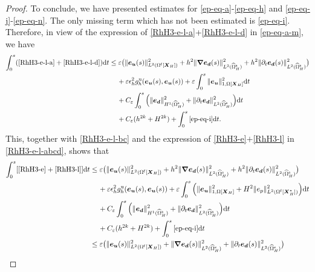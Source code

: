 \documentclass[11pt,reqno]{amsart}
\theoremstyle{definition}
\theoremstyle{plain}
\numberwithin{theorem}{section}
\numberwithin{proposition}{section}
\numberwithin{lemma}{section}
\numberwithin{equation}{section}
\newcommand{\bs}[1]{\boldsymbol{#1}}
\newcommand{\uu}[1]  {{\bs{#1}} }
\newcommand{\dep}{{{\bs{d}}}}
\newcommand{\grad}   { \uu{\nabla}    }
\def\d{\mathrm{d}}
\renewcommand{\(}{\bigl(}
\renewcommand{\)}{\bigr)}
\begin{document}
\begin{proof}
To conclude, we have presented estimates for \eqref{ep-eq-a}-\eqref{ep-eq-h} and \eqref{ep-eq-j}-\eqref{ep-eq-n}. The only missing term which has not been estimated is \eqref{ep-eq-i}. Therefore, in view of the expression of \eqref{RhH3-e-l-a}+\eqref{RhH3-e-l-d} in \eqref{ep-eq-a-m}, we have 
\begin{align}
\int_0^s( \eqref{RhH3-e-l-a}+\eqref{RhH3-e-l-d} )\d t  
&\le \varepsilon \big( \|{\bs e}_{\bs u}(s)\|_{L^2(\Omega^{\rm f}[\bs X_H])}^2 
+ h^2
\|\grad{\bs e}_{\bs d}(s)\|_{L^2(\widehat\Omega^{\rm s}_H)}^2 + h^2 \|\partial_t{\bs e}_{\bs d}(s)\|_{L^2(\widehat\Omega^{\rm s}_H)}^2 \big) \notag\\
&\quad\, + \varepsilon \epsilon_h^2 g^{\rm u}_h({\bs e}_{\bs u}(s),{\bs e}_{\bs u}(s)) + \varepsilon \int_0^s \|{\bs e}_{\bs u}\|_{1,\Omega[{\bs X}_H]}^2 \d t \notag\\
&\quad\, + C_\varepsilon  \int_0^s \Big(\|{\bs e}_\dep\|_{H^1(\widehat{\Omega}^{\rm s}_H)}^2 + \|\partial_t{\bs e}_\dep\|_{L^2(\widehat{\Omega}^{\rm s}_H)}^2\Big) \d t \notag\\
&\quad\, 
+ C_\varepsilon (h^{2k} + H^{2k}) + \int_0^s \eqref{ep-eq-i} \d t .
\end{align}
This, together with \eqref{RhH3-e-l-bc} and the expression of \eqref{RhH3-e}$+$\eqref{RhH3-l} in \eqref{RhH3-e-l-abcd}, shows that 
\begin{align}
\int_0^s[ \eqref{RhH3-e} + \eqref{RhH3-l} ] \d t 
&\le \varepsilon \big( \|{\bs e}_{\bs u}(s)\|_{L^2(\Omega^{\rm f}[\bs X_H])}^2 
+ h^2
\|\grad{\bs e}_{\bs d}(s)\|_{L^2(\widehat\Omega^{\rm s}_H)}^2 + h^2 \|\partial_t{\bs e}_{\bs d}(s)\|_{L^2(\widehat\Omega^{\rm s}_H)}^2 \big) \notag\\
&\quad\, + \varepsilon \epsilon_h^2 g^{\rm u}_h({\bs e}_{\bs u}(s),{\bs e}_{\bs u}(s)) + \varepsilon \int_0^s \Big(\|{\bs e}_{\bs u}\|_{1,\Omega[{\bs X}_H]}^2 
+ H^2\|e_p\|_{L^2(\Omega^{\rm f}[\bs X_H^*])}^2 \Big) \d t \notag\\
&\quad\, + C_\varepsilon  \int_0^s \Big(\|{\bs e}_\dep\|_{H^1(\widehat{\Omega}^{\rm s}_H)}^2 + \|\partial_t{\bs e}_\dep\|_{L^2(\widehat{\Omega}^{\rm s}_H)}^2 \Big) \d t \notag\\
&\quad\, 
+ C_\varepsilon (h^{2k} + H^{2k}) + \int_0^s \eqref{ep-eq-i} \d t \notag\\ 
&\le \varepsilon \big( \|{\bs e}_{\bs u}(s)\|_{L^2(\Omega^{\rm f}[\bs X_H])}^2 
+ 
\|\grad{\bs e}_{\bs d}(s)\|_{L^2(\widehat\Omega^{\rm s}_H)}^2 + \|\partial_t{\bs e}_{\bs d}(s)\|_{L^2(\widehat\Omega^{\rm s}_H)}^2 \big) \notag\\

\end{align}
\end{proof}
\end{document}

